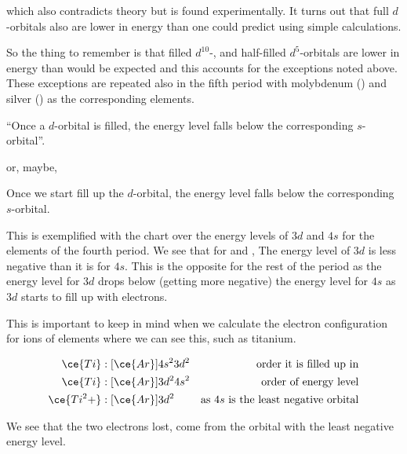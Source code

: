 \documentclass[../mit-general-chemistry.tex]{subfiles}
\begin{document}
which also contradicts theory but is found experimentally. It turns
out that full $d$-orbitals also are lower in energy than one could
predict using simple calculations.

So the thing to remember is that filled $d^{10}$-, and half-filled
$d^5$-orbitals are lower in energy than would be expected and this
accounts for the exceptions noted above. These exceptions are repeated
also in the fifth period with molybdenum () and silver
() as the corresponding elements.

``Once a $d$-orbital is filled, the energy level falls below the
corresponding $s$-orbital''.

or, maybe,

Once we start fill up the $d$-orbital, the energy level falls below
the corresponding $s$-orbital.

This is exemplified with the chart over the energy levels of $3d$ and
$4s$ for the elements of the fourth period. We see that for  and
, The energy level of $3d$ is less negative than it is for
$4s$. This is the opposite for the rest of the period as the energy
level for $3d$ drops below (getting more negative) the energy level
for $4s$ as $3d$ starts to fill up with electrons.

This is important to keep in mind when we calculate the electron
configuration for ions of elements where we can see this, such as
titanium.

\begin{align*}
  \ce{Ti} &: [\ce{Ar}]4s^23d^2 &\text{order it is filled up in} \\
  \ce{Ti} &: [\ce{Ar}]3d^24s^2 &\text{order of energy level} \\
  \ce{Ti^2+} &: [\ce{Ar}]3d^2 &\text{as $4s$ is the least negative orbital}\\
\end{align*}

We see that the two electrons lost, come from the orbital with the
least negative energy level.




\end{document}
